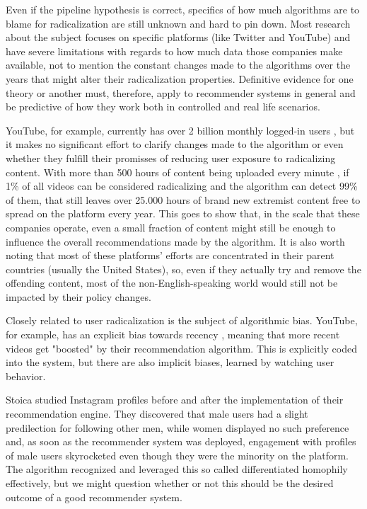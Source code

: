 Even if the pipeline hypothesis is correct, specifics of how much algorithms are
to blame for radicalization are still unknown and hard to pin down. Most
research about the subject focuses on specific platforms (like Twitter and
YouTube) and have severe limitations with regards to how much data those
companies make available, not to mention the constant changes made to the
algorithms over the years that might alter their radicalization properties.
Definitive evidence for one theory or another must, therefore, apply to
recommender systems in general and be predictive of how they work both in
controlled and real life scenarios.


YouTube, for example, currently has over 2 billion monthly logged-in users
\citep{}, but it makes no significant effort to clarify changes made to the
algorithm or even whether they fulfill their promisses of reducing user exposure
to radicalizing content. With more than 500 hours of content being uploaded
every minute \citep{}, if 1\% of all videos can be considered radicalizing and
the algorithm can detect 99\% of them, that still leaves over 25.000 hours of
brand new extremist content free to spread on the platform every year. This goes
to show that, in the scale that these companies operate, even a small fraction
of content might still be enough to influence the overall recommendations made
by the algorithm. It is also worth noting that most of these platforms' efforts
are concentrated in their parent countries (usually the United States), so, even
if they actually try and remove the offending content, most of the
non-English-speaking world would still not be impacted by their policy changes.

Closely related to user radicalization is the subject of algorithmic bias.
YouTube, for example, has an explicit bias towards recency \citep{}, meaning
that more recent videos get "boosted" by their recommendation algorithm. This is
explicitly coded into the system, but there are also implicit biases, learned by
watching user behavior.

Stoica \citep{} studied Instagram profiles before and after the implementation
of their recommendation engine. They discovered that male users had a slight
predilection for following other men, while women displayed no such preference
and, as soon as the recommender system was deployed, engagement with profiles of
male users skyrocketed even though they were the minority on the platform. The
algorithm recognized and leveraged this so called differentiated homophily
effectively, but we might question whether or not this should be the desired
outcome of a good recommender system.

